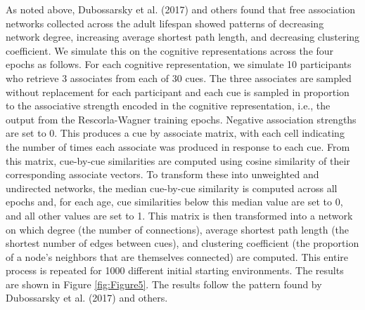 \documentclass[
  man,floatsintext]{apa6}
\begin{document}
As noted above, Dubossarsky et al. (2017) and others found that free association networks collected across the adult lifespan showed patterns of decreasing network degree, increasing average shortest path length, and decreasing clustering coefficient. We simulate this on the cognitive representations across the four epochs as follows. For each cognitive representation, we simulate 10 participants who retrieve 3 associates from each of 30 cues. The three associates are sampled without replacement for each participant and each cue is sampled in proportion to the associative strength encoded in the cognitive representation, i.e., the output from the Rescorla-Wagner training epochs. Negative association strengths are set to 0. This produces a cue by associate matrix, with each cell indicating the number of times each associate was produced in response to each cue. From this matrix, cue-by-cue similarities are computed using cosine similarity of their corresponding associate vectors. To transform these into unweighted and undirected networks, the median cue-by-cue similarity is computed across all epochs and, for each age, cue similarities below this median value are set to 0, and all other values are set to 1. This matrix is then transformed into a network on which degree (the number of connections), average shortest path length (the shortest number of edges between cues), and clustering coefficient (the proportion of a node's neighbors that are themselves connected) are computed. This entire process is repeated for 1000 different initial starting environments. The results are shown in Figure \ref{fig:Figure5}. The results follow the pattern found by Dubossarsky et al. (2017) and others.
\end{document}
